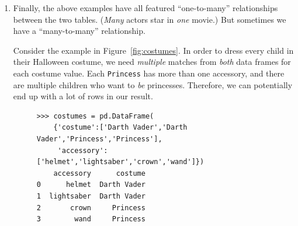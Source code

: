 \begin{enumerate}
\begin{Verbatim}[fontsize=\small,samepage=true,frame=none]
                            actors:
    actor           year   film                   salary (millions)
    ---------------------------------------------------------------
    Downey Jr.      1965   The Avengers           50
    Johansson       1984   The Avengers           20
    DiCaprio        1974   Inception              59
    Hanks           1956   Forrest Gump           70
    Bullock         1964   Gravity                77
    ...
\end{Verbatim}

Then the resulting DataFrame would need to have two columns named
``\texttt{year}'', with different meanings. Pandas solves this by renaming the
conflicting columns with a ``\texttt{\_x}'' or ``\texttt{\_y}'' suffix,
corresponding to the left/right tables in the join:

\footnotesize
\begin{Verbatim}[fontsize=\footnotesize,samepage=true,frame=none]
                            actors_movies:
actor      year_x   film       salary (millions)   title      director   year_y
-------------------------------------------------------------------------------
Bullock    1964     Gravity    77                  Gravity    Cuaron     2013
DiCaprio   1974     Inception  59                  Inception  Nolan      2010
\end{Verbatim}
\normalsize

(which, of course, you can rename at will via
``\texttt{actors\_movies.columns}''.)

\item Finally, the above examples have all featured ``one-to-many''
relationships between the two tables. (\textit{Many} actors star in
\textit{one} movie.) But sometimes we have a ``many-to-many'' relationship.

Consider the example in Figure~\ref{fig:costumes}. In order to dress every
child in their Halloween costume, we need \textit{multiple} matches from
\textit{both} data frames for each costume value. Each \texttt{Princess} has
more than one accessory, and there are multiple children who want to
\textit{be} princesses. Therefore, we can potentially end up with a lot of
rows in our result.


\begin{figure}
\begin{Verbatim}[fontsize=\footnotesize,samepage=true,frame=single]
>>> costumes = pd.DataFrame(
    {'costume':['Darth Vader','Darth Vader','Princess','Princess'],
     'accessory':['helmet','lightsaber','crown','wand']})
    accessory      costume
0      helmet  Darth Vader
1  lightsaber  Darth Vader
2       crown     Princess
3        wand     Princess


\end{Verbatim}
\end{figure}
\end{enumerate}
